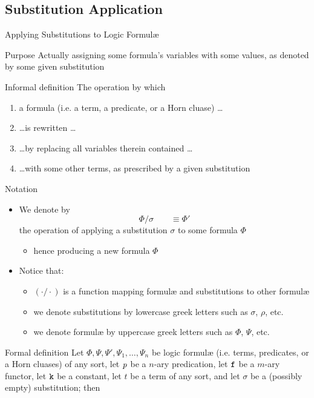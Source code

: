 \documentclass[presentation]{beamer}\mode<presentation>{\usetheme{AMSBolognaFC}}
\begin{document}
\subsection{Substitution Application}

\begin{frame}[allowframebreaks]{Applying Substitutions to Logic Formul\ae{}}
    \begin{block}{Purpose}\centering
        Actually assigning some formula's variables with some values, as denoted by some given substitution
    \end{block}
    \begin{block}{Informal definition}
        The operation by which 
        \begin{enumerate}
            \item a formula (i.e. a term, a predicate, or a Horn cluase) \ldots
            \item \ldots is \alert{rewritten} \ldots
            \item \ldots by \alert{replacing} all variables therein contained \ldots
            \item \ldots with some other \alert{terms}, as prescribed by a given \alert{substitution}
        \end{enumerate}
    \end{block}
    \begin{block}{Notation}
        \begin{itemize}
            \item We denote by 
            \[ \Phi / \sigma \qquad \equiv \Phi'\]
            the operation of applying a substitution $\sigma$ to some formula $\Phi$
            \begin{itemize}
                \item hence producing a new formula $\Phi$
            \end{itemize}

            \item Notice that:
            \begin{itemize}
                \item $(\cdot / \cdot)$ is a function mapping formul\ae{} and substitutions to other formul\ae{}
                \item we denote substitutions by lowercase greek letters such as $\sigma$, $\rho$, etc.
                \item we denote formul\ae{} by uppercase greek letters such as $\Phi$, $\Psi$, etc.
            \end{itemize} 
        \end{itemize}
    \end{block}
    \begin{alertblock}{Formal definition}
        Let $\Phi, \Psi, \Psi', \Psi_1, \ldots, \Psi_n$ be logic formul\ae{} (i.e. terms, predicates, or a Horn cluases) of any sort, 
        let $\text{\textit{p}}$ be a $n$-ary predication, let $\mathtt{f}$ be a $m$-ary functor, let $\mathtt{k}$ be a constant, let $t$ be a term of any sort,
        and let $\sigma$ be a (possibly empty) substitution;
        then
        

\end{alertblock}
\end{frame}
\end{document}
